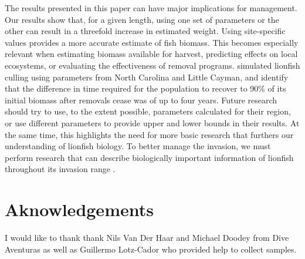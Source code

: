 \documentclass[fleqn,10pt,lineno]{wlpeerj} %
\begin{document}
The results presented in this paper can have major implications for
management. Our results show that, for a given length, using one set of
parameters or the other can result in a threefold increase in estimated
weight. Using site-specific values provides a more accurate estimate of
fish biomass. This becomes especially relevant when estimating biomass
available for harvest, predicting effects on local ecosystems, or
evaluating the effectiveness of removal programs. \citet{edwards_2014}
simulated lionfish culling using parameters from North Carolina and
Little Cayman, and identify that the difference in time required for the
population to recover to 90\% of its initial biomass after removals
cease was of up to four years. Future research should try to use, to the
extent possible, parameters calculated for their region, or use
different parameters to provide upper and lower bounds in their results.
At the same time, this highlights the need for more basic research that
furthers our understanding of lionfish biology. To better manage the
invasion, we must perform research that can describe biologically
important information of lionfish throughout its invasion range
\citep{johnson_2016}.

\section*{Aknowledgements}

I would like to thank thank Nils Van Der Haar and Michael Doodey from
Dive Aventuras as well as Guillermo Lotz-Cador who provided help to
collect samples.


\end{document}
